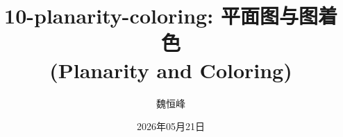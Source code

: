 \documentclass[]{beamer}
\title[10-planarity-coloring: 平面图与图着色]{10-planarity-coloring: 平面图与图着色\\(Planarity and Coloring)}
\author[魏恒峰]{\large 魏恒峰}
\institute{hfwei@hnu.edu.cn}
\date{2026年05月21日}
\begin{document}
\maketitle







\thankyou{}

\end{document}
